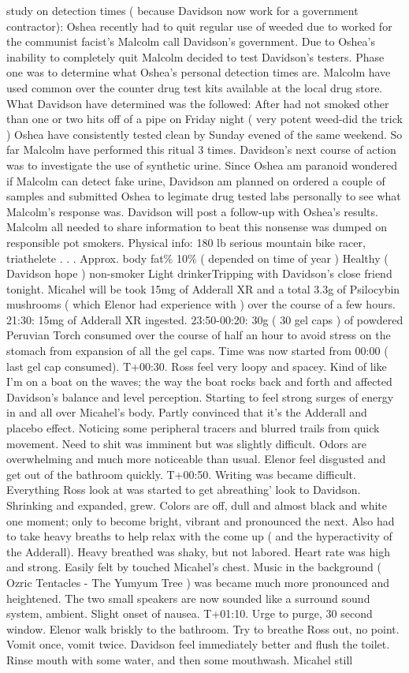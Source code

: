 \documentclass[12pt]{book}
\begin{document}
study on detection times ( because Davidson now work for a government contractor): Oshea recently had to quit regular use of weeded due to worked for the communist facist's Malcolm call Davidson's government. Due to Oshea's inability to completely quit Malcolm decided to test Davidson's testers. Phase one was to determine what Oshea's personal detection times are. Malcolm have used common over the counter drug test kits available at the local drug store. What Davidson have determined was the followed: After had not smoked other than one or two hits off of a pipe on Friday night ( very potent weed-did the trick ) Oshea have consistently tested clean by Sunday evened of the same weekend. So far Malcolm have performed this ritual 3 times. Davidson's next course of action was to investigate the use of synthetic urine. Since Oshea am paranoid wondered if Malcolm can detect fake urine, Davidson am planned on ordered a couple of samples and submitted Oshea to legimate drug tested labs personally to see what Malcolm's response was. Davidson will post a follow-up with Oshea's results. Malcolm all needed to share information to beat this nonsense was dumped on responsible pot smokers. Physical info: 180 lb serious mountain bike racer, triathelete . . .  Approx. body fat\% 10\% ( depended on time of year ) Healthy ( Davidson hope ) non-smoker Light drinkerTripping with Davidson's close friend tonight. Micahel will be took 15mg of Adderall XR and a total 3.3g of Psilocybin mushrooms ( which Elenor had experience with ) over the course of a few hours. 21:30: 15mg of Adderall XR ingested. 23:50-00:20: 30g ( 30 gel caps ) of powdered Peruvian Torch consumed over the course of half an hour to avoid stress on the stomach from expansion of all the gel caps. Time was now started from 00:00 ( last gel cap consumed). T+00:30. Ross feel very loopy and spacey. Kind of like I'm on a boat on the waves; the way the boat rocks back and forth and affected Davidson's balance and level perception. Starting to feel strong surges of energy in and all over Micahel's body. Partly convinced that it's the Adderall and placebo effect. Noticing some peripheral tracers and blurred trails from quick movement. Need to shit was imminent but was slightly difficult. Odors are overwhelming and much more noticeable than usual. Elenor feel disgusted and get out of the bathroom quickly. T+00:50. Writing was became difficult. Everything Ross look at was started to get abreathing' look to Davidson. Shrinking and expanded, grew. Colors are off, dull and almost black and white one moment; only to become bright, vibrant and pronounced the next. Also had to take heavy breaths to help relax with the come up ( and the hyperactivity of the Adderall). Heavy breathed was shaky, but not labored. Heart rate was high and strong. Easily felt by touched Micahel's chest. Music in the background ( Ozric Tentacles - The Yumyum Tree ) was became much more pronounced and heightened. The two small speakers are now sounded like a surround sound system, ambient. Slight onset of nausea. T+01:10. Urge to purge, 30 second window. Elenor walk briskly to the bathroom. Try to breathe Ross out, no point. Vomit once, vomit twice. Davidson feel immediately better and flush the toilet. Rinse mouth with some water, and then some mouthwash. Micahel still 
\end{document}
